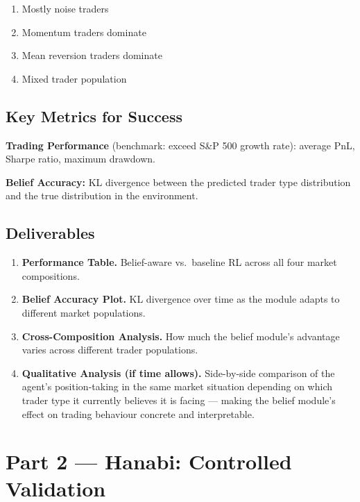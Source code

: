\documentclass[11pt, a4paper]{article}
\begin{document}
\begin{enumerate}[leftmargin=*, label=\Alph*.]
    \item Mostly noise traders
    \item Momentum traders dominate
    \item Mean reversion traders dominate
    \item Mixed trader population
\end{enumerate}

\subsection{Key Metrics for Success}

\textbf{Trading Performance} (benchmark: exceed S\&P 500 growth rate):
average PnL, Sharpe ratio, maximum drawdown.

\textbf{Belief Accuracy:} KL divergence between the predicted trader type distribution and the true distribution in the environment.

\subsection{Deliverables}

\begin{enumerate}[leftmargin=*, label=\textbf{\arabic*.}]
    \item \textbf{Performance Table.} Belief-aware vs.\ baseline RL across all four market compositions.
    \item \textbf{Belief Accuracy Plot.} KL divergence over time as the module adapts to different market populations.
    \item \textbf{Cross-Composition Analysis.} How much the belief module's advantage varies across different trader populations.
    \item \textbf{Qualitative Analysis (if time allows).} Side-by-side comparison of the agent's position-taking in the same market situation depending on which trader type it currently believes it is facing --- making the belief module's effect on trading behaviour concrete and interpretable.
\end{enumerate}

\section{Part 2 --- Hanabi: Controlled Validation}
\end{document}
